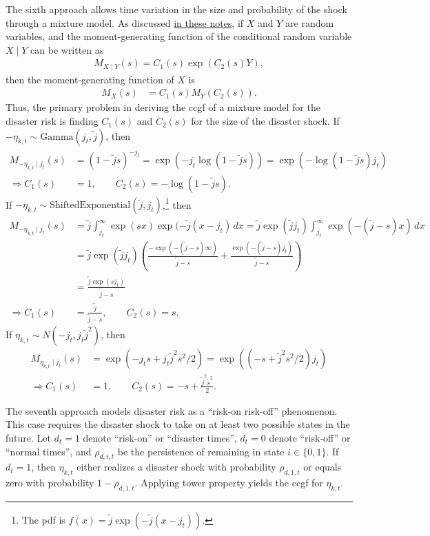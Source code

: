 \documentclass[12 pt, oneside]{article}
\theoremstyle{definition}
\theoremstyle{definition}
\theoremstyle{definition}
\newcommand{\RA}{\Rightarrow}
\begin{document}
The sixth approach allows time variation in the size and probability of the shock through a mixture model. As discussed \href{https://chenwilliam77.github.io/RiskAdjustedLinearizations.jl/stable/tips/\#ccgf-tips-1}{in these notes}, if $X$ and $Y$ are random variables, and the moment-generating function of the conditional random variable $X\mid Y$ can be written as
\begin{align*}
  M_{X \mid Y}(s) = C_1(s) \exp(C_2(s) Y),
\end{align*}
then the moment-generating function of $X$ is
\begin{align*}
  M_X(s) & = C_1(s) M_Y(C_2(s)).
\end{align*}
Thus, the primary problem in deriving the ccgf of a mixture model for the disaster risk is finding $C_1(s)$ and $C_2(s)$ for the size of the disaster shock. If $-\eta_{k, t} \sim \text{Gamma}(j_t, \tilde{j})$, then
\begin{align*}
  M_{-\eta_{k, t} \mid j_t}(s) & = (1 - \tilde{j} s)^{-j_t} = \exp(-j_t\log(1 - \tilde{j} s)) = \exp(-\log(1 - \tilde{j} s) j_t)\\
\RA  C_1(s) & = 1,\quad \quad C_2(s) = -\log(1 - \tilde{j} s).
\end{align*}
If $-\eta_{k, t} \sim \text{ShiftedExponential}(\tilde{j}, j_t)$,\footnote{The pdf is $f(x) = \tilde{j} \exp( - \tilde{j}(x - j_t))$.} then
\begin{align*}
  M_{-\eta_{k, t} \mid j_t}(s) & = \tilde{j}\int_{j_t}^\infty \exp(s x)\exp(-\tilde{j}(x - j_t)\, dx = \tilde{j} \exp(\tilde{j}j_t)\int_{j_t}^\infty \exp(-(\tilde{j} - s)x)\, dx\\
                               & = \tilde{j} \exp(\tilde{j} j_t)\left(\frac{-\exp(-(\tilde{j} - s) \infty)}{\tilde{j} - s} + \frac{\exp(-(\tilde{j} - s) j_t)}{\tilde{j} - s}\right)\\
                               & = \frac{\tilde{j} \exp(s j_t)}{\tilde{j} - s}\\
  \RA C_1(s) & = \frac{\tilde{j}}{\tilde{j} - s}, \quad\quad C_2(s) = s.
\end{align*}
If $\eta_{k, t} \sim N(-j_t, j_t \tilde{j}^2)$, then
\begin{align*}
  M_{\eta_{k, t} \mid j_t}(s) & = \exp(-j_t  s + j_t \tilde{j}^2 s^2  / 2) = \exp((-s + \tilde{j}^2 s^2 / 2) j_t)\\
  \RA C_1(s) & = 1, \quad\quad C_2(s) = -s + \frac{\tilde{j}^2\tilde{s}^2}{2}.
\end{align*}

The seventh approach models disaster risk as a ``risk-on risk-off'' phenomenon. This case requires the disaster shock to take on at least two possible states in the future. Let $d_t = 1$ denote ``risk-on'' or ``disaster times'', $d_t = 0$ denote ``risk-off'' or ``normal times'', and  $\rho_{d, i, t}$ be the persistence of remaining in state $i \in \{0, 1\}$. If $d_t= 1$, then $\eta_{k, t}$ either realizes a disaster shock with probability $\rho_{d, 1, t}$ or equals zero with probability $1 - \rho_{d, 1, t}$. Applying tower property yields the ccgf for $\eta_{k, t}$.
\end{document}
